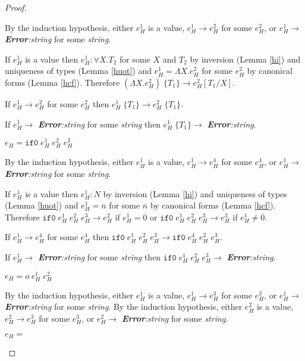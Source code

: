 \begin{hps}
\begin{proof}
\begin{hps-case-8}
By the induction hypothesis, either $e_{H}^{1}$ is a value, $e_{H}^{1}\rightarrow e_{H}^{2}$ for some $e_{H}^{2}$, or $e_{H}^{1}\rightarrow$ \emph{\textbf{Error}:\;string} for some \emph{string}.

If $e_{H}^{1}$ is a value then $e_{H}^{1}:\forall X.T_{2}$ for some $X$ and $T_{2}$ by inversion (Lemma \ref{hi}) and uniqueness of types (Lemma \ref{huot}) and $e_{H}^{1}=\Lambda X.e_{H}^{2}$ for some $e_{H}^{2}$ by canonical forms (Lemma \ref{hcf}).  Therefore $(\Lambda X.e_{H}^{2})\;\lbrace T_{1}\rbrace\rightarrow e_{H}^{2}[T_{1}/X]$.

If $e_{H}^{1}\rightarrow e_{H}^{2}$ for some $e_{H}^{2}$ then $e_{H}^{1}\;\lbrace T_{1}\rbrace\rightarrow e_{H}^{2}\;\lbrace T_{1}\rbrace$.

If $e_{H}^{1}\rightarrow$ \emph{\textbf{Error}:\;string} for some \emph{string} then $e_{H}^{1}\;\lbrace T_{1}\rbrace\rightarrow$ \emph{\textbf{Error}:\;string}.
\end{hps-case-8}
\begin{hps-case-9}
$e_{H}=\mathtt{if0}\;e_{H}^{1}\;e_{H}^{2}\;e_{H}^{3}$

By the induction hypothesis, either $e_{H}^{1}$ is a value, $e_{H}^{1}\rightarrow e_{H}^{4}$ for some $e_{H}^{4}$, or $e_{H}^{1}\rightarrow$ \emph{\textbf{Error}:\;string} for some \emph{string}.

If $e_{H}^{1}$ is a value then $e_{H}^{1}:N$ by inversion (Lemma \ref{hi}) and uniqueness of types (Lemma \ref{huot}) and $e_{H}^{1}=\overline{n}$ for some $\overline{n}$ by canonical forms (Lemma \ref{hcf}).  Therefore $\mathtt{if0}\;e_{H}^{1}\;e_{H}^{2}\;e_{H}^{3}\rightarrow e_{H}^{2}$ if $e_{H}^{1}=\overline{0}$ or $\mathtt{if0}\;e_{H}^{1}\;e_{H}^{2}\;e_{H}^{3}\rightarrow e_{H}^{3}$ if $e_{H}^{1}\neq\overline{0}$.

If $e_{H}^{1}\rightarrow e_{H}^{4}$ for some $e_{H}^{4}$ then $\mathtt{if0}\;e_{H}^{1}\;e_{H}^{2}\;e_{H}^{3}\rightarrow \mathtt{if0}\;e_{H}^{4}\;e_{H}^{2}\;e_{H}^{3}$.

If $e_{H}^{1}\rightarrow$ \emph{\textbf{Error}:\;string} for some \emph{string} then $\mathtt{if0}\;e_{H}^{1}\;e_{H}^{2}\;e_{H}^{3}\rightarrow$ \emph{\textbf{Error}:\;string}.
\end{hps-case-9}
\begin{hps-case-10}
$e_{H}=o\;e_{H}^{1}\;e_{H}^{2}$

By the induction hypothesis, either $e_{H}^{1}$ is a value, $e_{H}^{1}\rightarrow e_{H}^{3}$ for some $e_{H}^{3}$, or $e_{H}^{1}\rightarrow$ \emph{\textbf{Error}:\;string} for some \emph{string}.  By the induction hypothesis, either $e_{H}^{2}$ is a value, $e_{H}^{2}\rightarrow e_{H}^{3}$ for some $e_{H}^{3}$, or $e_{H}^{2}\rightarrow$ \emph{\textbf{Error}:\;string} for some \emph{string}.


\end{hps-case-10}
\begin{hps-case-11}
$e_{H}=$


\end{hps-case-11}
\end{proof}
\end{hps}